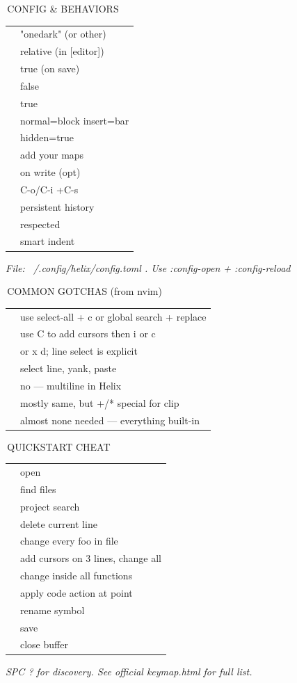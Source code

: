 \documentclass[9pt,a4paper,landscape]{extarticle}
\makeatletter
\newcommand{\kbd}[1]{{\ttfamily\bfseries\footnotesize\color{keyclr}#1}}
\newcommand{\sect}[1]{%
  \vspace{0pt}%
  {\setlength{\fboxsep}{0.5pt}%
   \noindent\colorbox{hdrbg}{\parbox{\dimexpr\columnwidth-1pt\relax}{%
     \color{hdrfg}\bfseries\sffamily\footnotesize\strut\,#1}}}%
  \par\vspace{0pt}}
\newlength{\kdsep}\setlength{\kdsep}{0pt}
\newcommand{\kd}[2]{\kbd{#1} & #2 \\[\kdsep]}
\newenvironment{kt}{%
  \setlength{\tabcolsep}{0pt}%
  \begin{tabular}{@{}>{\footnotesize\raggedright\arraybackslash}p{17mm}@{\hspace{1.5pt}}>{\footnotesize\color{bodyclr}\raggedright\arraybackslash}p{\dimexpr\columnwidth-17mm-1.5pt\relax}@{}}%
}{%
  \end{tabular}\par}
\newcommand{\snote}[1]{{\scriptsize\color{noteclr}\textit{#1}}\vspace{0pt}\par}
\makeatother
\begin{document}
\begin{multicols}{5}
\sect{CONFIG \& BEHAVIORS}
\begin{kt}
\kd{theme}{"onedark" (or other)}
\kd{line-number}{relative (in [editor])}
\kd{auto-format}{true (on save)}
\kd{auto-save}{false}
\kd{cursorline}{true}
\kd{cursor-shape}{normal=block insert=bar}
\kd{file-picker}{hidden=true}
\kd{keys.normal}{add your maps}
\kd{trim-ws}{on write (opt)}
\kd{jumplist}{C-o/C-i +C-s}
\kd{undo}{persistent history}
\kd{EditorConfig}{respected}
\kd{smart-tab}{smart indent}
\end{kt}
\snote{File: ~/.config/helix/config.toml . Use :config-open + :config-reload}

\sect{COMMON GOTCHAS (from nvim)}
\begin{kt}
\kd{no :\%s}{use select-all + c or global search + replace}
\kd{no visual block I}{use C to add cursors then i or c}
\kd{dd is xd}{or x d; line select is explicit}
\kd{yyp is x y p}{select line, yank, paste}
\kd{f only line?}{no --- multiline in Helix}
\kd{registers}{mostly same, but +/* special for clip}
\kd{plugins}{almost none needed --- everything built-in}
\end{kt}

\sect{QUICKSTART CHEAT}
\begin{kt}
\kd{hx file.rs}{open}
\kd{SPC f}{find files}
\kd{SPC / foo}{project search}
\kd{x d}{delete current line}
\kd{\% s foo Enter c}{change every foo in file}
\kd{C C c bar Esc}{add cursors on 3 lines, change all}
\kd{ma f c}{change inside all functions}
\kd{SPC a}{apply code action at point}
\kd{SPC r newname}{rename symbol}
\kd{:w}{save}
\kd{:bc or SPC w?}{close buffer}
\end{kt}
\snote{SPC ? for discovery. See official keymap.html for full list.}

\end{multicols}
\end{document}
